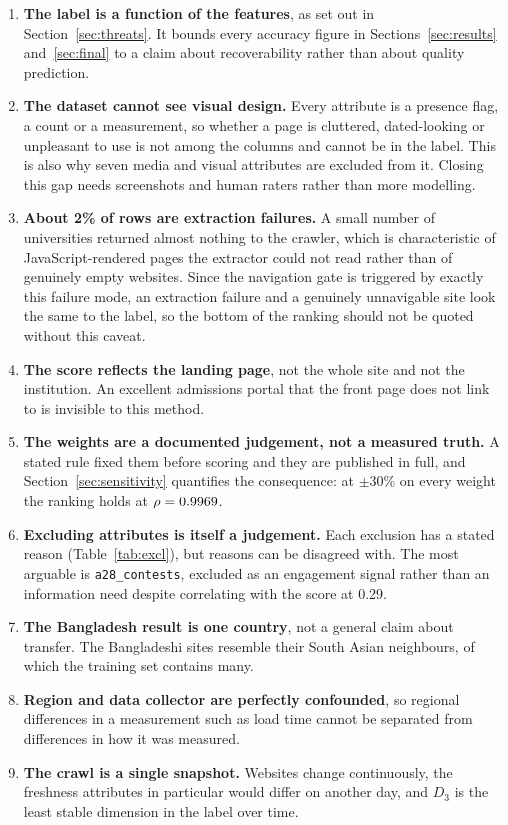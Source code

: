 \documentclass[11pt,a4paper]{article}
\begin{document}
\begin{enumerate}
\item \textbf{The label is a function of the features}, as set out in Section~\ref{sec:threats}. It
bounds every accuracy figure in Sections~\ref{sec:results} and~\ref{sec:final} to a claim about
recoverability rather than about quality prediction.
\item \textbf{The dataset cannot see visual design.} Every attribute is a presence flag, a count or a
measurement, so whether a page is cluttered, dated-looking or unpleasant to use is not among the
\nFeat{} columns and cannot be in the label. This is also why seven media and visual attributes are
excluded from it. Closing this gap needs screenshots and human raters rather than more modelling.
\item \textbf{About 2\% of rows are extraction failures.} A small number of universities returned
almost nothing to the crawler, which is characteristic of JavaScript-rendered pages the extractor
could not read rather than of genuinely empty websites. Since the navigation gate is triggered by
exactly this failure mode, an extraction failure and a genuinely unnavigable site look the same to the
label, so the bottom of the ranking should not be quoted without this caveat.
\item \textbf{The score reflects the landing page}, not the whole site and not the institution. An
excellent admissions portal that the front page does not link to is invisible to this method.
\item \textbf{The weights are a documented judgement, not a measured truth.} A stated rule fixed them
before scoring and they are published in full, and Section~\ref{sec:sensitivity} quantifies the
consequence: at $\pm 30\%$ on every weight the ranking holds at $\rho = 0.9969{}$.
\item \textbf{Excluding \nUnscored{} attributes is itself a judgement.} Each exclusion has a stated
reason (Table~\ref{tab:excl}), but reasons can be disagreed with. The most arguable is
\texttt{a28\_contests}, excluded as an engagement signal rather than an information need despite
correlating with the score at 0.29.
\item \textbf{The Bangladesh result is one country}, not a general claim about transfer. The \nBD{}
Bangladeshi sites resemble their South Asian neighbours, of which the training set contains many.
\item \textbf{Region and data collector are perfectly confounded}, so regional differences in a
measurement such as load time cannot be separated from differences in how it was measured.
\item \textbf{The crawl is a single snapshot.} Websites change continuously, the freshness attributes
in particular would differ on another day, and $D_3$ is the least stable dimension in the label over
time.
\end{enumerate}
\end{document}
